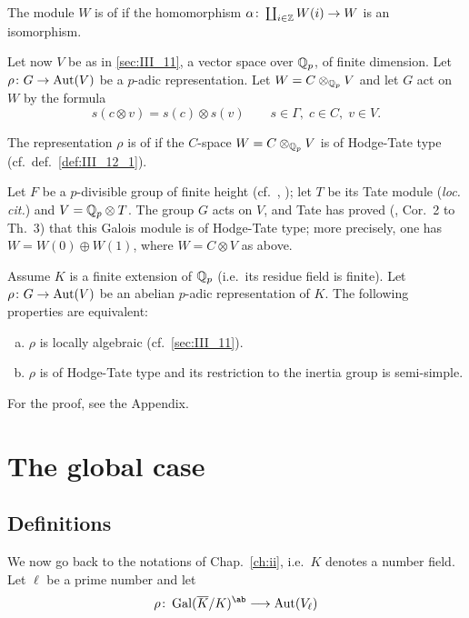 \begin{mydef}\label{def:III_12_1}
	The module $W$ is of %
	if the homomorphism $\alpha\colon \coprod_{i\in\mathbb{Z}} W(i) \to W$ is an
	isomorphism.
\end{mydef}

Let now $V$ be as in \ref{sec:III_11}, a vector space over $\mathbb{Q}_p$, of finite
dimension. Let $\rho\colon G \to \operatorname{Aut}(V)$ be a $p$-adic representation. Let $W
= C \otimes_{\mathbb{Q}_p} V$ and let $G$ act on $W$ by the formula
\dpage
\[
	s(c\otimes v) = s(c) \otimes s(v) \qquad
	s\in \Gamma, \; c\in C, \; v\in V.
\]
\begin{mydef}
	The representation $\rho$ is of %
	 if the $C$-space $W = C \otimes_{\mathbb{Q}_p} V$ is of
	Hodge-Tate type (cf.\ def.~\ref{def:III_12_1}).
\end{mydef}

\begin{ex}
	Let $F$ be a $p$-divisible group of finite height (cf.\ \cite{26},
	\cite{39}); let $T$ be its Tate module (\emph{loc. cit.}) and $V = \mathbb{Q}_p
	\otimes T$. The group $G$ acts on $V$, and Tate has proved (\cite{39},
	Cor.~2 to Th.~3) that this Galois module is of Hodge-Tate type; more
	precisely, one has $W = W(0) \oplus W(1)$, where $W = C \otimes V$ as
	above.
\end{ex}
\begin{thm}[Tate]
Assume $K$ is a finite extension of $\mathbb{Q}_p$ (i.e.\ its residue field is finite).
Let $\rho\colon G \to \operatorname{Aut}(V)$ be an abelian $p$-adic representation of $K$.
The following properties are equivalent:
\begin{enumerate}[(a)]
\item $\rho$ is locally algebraic (cf.\ \ref{sec:III_11}).
\item $\rho$ is of Hodge-Tate type and its restriction to the inertia group is
	semi-simple.
\end{enumerate}
\end{thm}
For the proof, see the Appendix.

\section{The global case}
\subsection{Definitions}
\label{sec:III_21}
We now go back to the notations of Chap.~\ref{ch:ii}, i.e.\ $K$ denotes a number
field. Let $\ell$ be a prime number and let 
\[
\rho \colon \Gal(\algcl{K}/K)^{\ab} \longrightarrow \Aut(V_\ell)
\]

